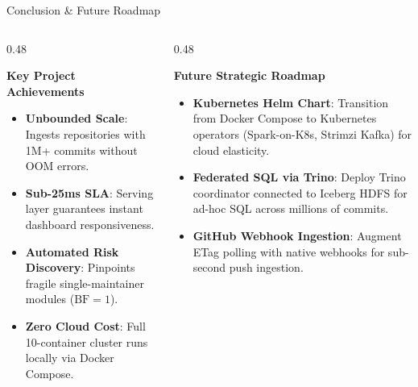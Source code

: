 \documentclass[aspectratio=169, 10pt]{beamer}
\begin{document}
\begin{frame}{Conclusion \& Future Roadmap}
  \begin{columns}[T]
    \begin{column}{0.48\textwidth}
      \begin{block}{\textbf{Key Project Achievements}}
        \begin{itemize}
          \item \textbf{Unbounded Scale}: Ingests repositories with 1M+ commits without OOM errors.
          \item \textbf{Sub-25ms SLA}: Serving layer guarantees instant dashboard responsiveness.
          \item \textbf{Automated Risk Discovery}: Pinpoints fragile single-maintainer modules ($\text{BF}=1$).
          \item \textbf{Zero Cloud Cost}: Full 10-container cluster runs locally via Docker Compose.
        \end{itemize}
      \end{block}
    \end{column}

    \begin{column}{0.48\textwidth}
      \begin{block}{\textbf{Future Strategic Roadmap}}
        \begin{itemize}
          \item \textbf{Kubernetes Helm Chart}: Transition from Docker Compose to Kubernetes operators (Spark-on-K8s, Strimzi Kafka) for cloud elasticity.
          \item \textbf{Federated SQL via Trino}: Deploy Trino coordinator connected to Iceberg HDFS for ad-hoc SQL across millions of commits.
          \item \textbf{GitHub Webhook Ingestion}: Augment ETag polling with native webhooks for sub-second push ingestion.
        \end{itemize}
      \end{block}
    \end{column}
  \end{columns}
\end{frame}
\end{document}
